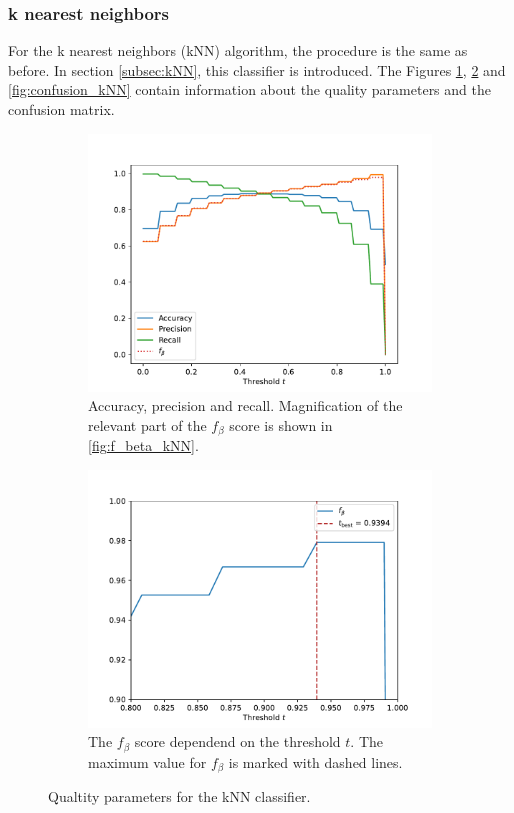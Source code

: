 \subsubsection{k nearest neighbors}
For the k nearest neighbors (kNN) algorithm, the procedure is the same as before. In section \ref{subsec:kNN}, this classifier is introduced.
The Figures \ref{fig:apr_kNN}, \ref{fig:f_beta_kNN} and \ref{fig:confusion_kNN} contain information about the quality parameters and the confusion 
matrix.
\begin{figure}
    \centering
    \begin{subfigure}{0.49\textwidth}
      \centering
      \includegraphics[width=\textwidth]{content/plots/apr_kNN.pdf}
        \caption{Accuracy, precision and recall. Magnification of the relevant part of the $f_{\beta}$ score is shown in \autoref{fig:f_beta_kNN}.}
        \label{fig:apr_kNN}
    \end{subfigure}
        \hfill
    \begin{subfigure}{0.49\textwidth}
      \centering
      \includegraphics[width=\textwidth]{content/plots/f_beta_kNN.pdf}
      \caption{The $f_{\beta}$ score dependend on the threshold $t$. The maximum value for $f_{\beta}$ is marked with dashed lines.}
      \label{fig:f_beta_kNN}
    \end{subfigure}
    \caption{Qualtity parameters for the kNN classifier.}
    \label{fig:kNN}
  \end{figure}
